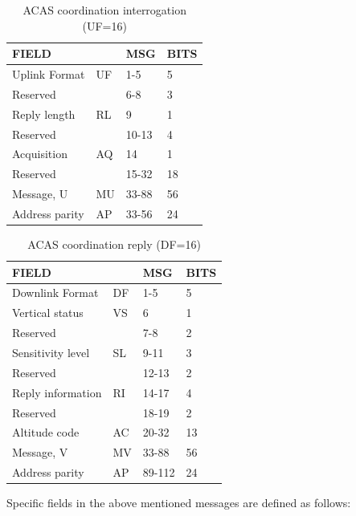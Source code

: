 \begin{table}[ht]
  \centering
  \caption{ACAS coordination interrogation (UF=16)}
  \label{tb:acas_uf_16}
  \begin{tabular}[t]{|l|l|l|l|}
  \hline
  \textbf{FIELD} & \textbf{} & \textbf{MSG} & \textbf{BITS} \\ \hline
  Uplink Format & UF & 1-5 & 5 \\ \hline
  Reserved &  & 6-8 & 3 \\ \hline
  Reply length & RL & 9 & 1 \\ \hline
  Reserved &  & 10-13 & 4 \\ \hline
  Acquisition & AQ & 14 & 1 \\ \hline
  Reserved &  & 15-32 & 18 \\ \hline
  Message, U & MU & 33-88 & 56 \\ \hline
  Address parity & AP & 33-56 & 24 \\ \hline
  \end{tabular}
\end{table}%

\begin{table}[ht]
  \centering
  \caption{ACAS coordination reply (DF=16)}
  \label{tb:acas_df_16}
  \begin{tabular}[t]{|l|l|l|l|}
  \hline
  \textbf{FIELD} & \textbf{} & \textbf{MSG} & \textbf{BITS} \\ \hline
  Downlink Format & DF & 1-5 & 5 \\ \hline
  Vertical status & VS & 6 & 1 \\ \hline
  Reserved &  & 7-8 & 2 \\ \hline
  Sensitivity level & SL & 9-11 & 3 \\ \hline
  Reserved &  & 12-13 & 2 \\ \hline
  Reply information & RI & 14-17 & 4 \\ \hline
  Reserved &  & 18-19 & 2 \\ \hline
  Altitude code & AC & 20-32 & 13 \\ \hline
  Message, V & MV & 33-88 & 56 \\ \hline
  Address parity & AP & 89-112 & 24 \\ \hline
  \end{tabular}
\end{table}


Specific fields in the above mentioned messages are defined as follows:

